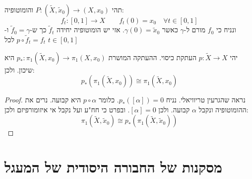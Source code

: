\documentclass{tstextbook}
\begin{document}
\begin{proposition}
תהי \(P:\left( \tilde{X},\tilde{x}_{0} \right)\to(X,x_{0})\) והומוטופיה:
$$f_{t}:[0,1]\to X\qquad f_{t}(0)=x_{0}\quad \forall t \in [0,1]$$
ונניח כי \(f_{0}\) מורם ל-\(\gamma\) כאשר \(\gamma(0)=\tilde{x}_{0}\). אזי יש הומוטופיה יחידה \(\tilde{f}_{t}\) כך ש-\(\tilde{f}_{0}=\gamma\) ו-\(p\circ \tilde{f}_{t}=f_{t}\) לכל \(t \in [0,1]\)

\end{proposition}
\begin{proposition}
יהי \(p:\tilde{X}\to X\) העתקת כיסוי. ההעתקה המושרת \(p_{*}:\pi_{1}\left( \tilde{X},x_{0} \right)\to \pi_{1}(X,x_{0})\) היא שיכון. ולכן:
$$p_{*}\left( \pi_{1}\left( \tilde{X},x_{0} \right) \right)\cong \pi_{1}\left( \tilde{X},x_{0} \right)$$

\end{proposition}
\begin{proof}
נראה שהגרעין טריוויאלי. נניח \(p_{*}\left( \left[ \alpha \right] \right)=0\). כלומר \(p\circ \alpha\) היא קבועה. נרים את ההומוטופיה ונקבל \(\alpha\) קבועה. ולכן \(\left[ \alpha \right]=0\).
ובפרט כי חח"ע ועל נקבל אי איזומורפיזם ולכן:
$$\pi_{1}\left( \tilde{X},\tilde{x}_{0} \right)\cong p_{*}\left( \pi_{1}\left( \tilde{X},\tilde{x}_{0} \right) \right)$$

\end{proof}
\section{מסקנות של החבורה היסודית של המעגל}
\end{document}
